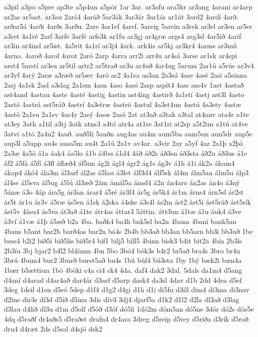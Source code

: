 {a3pil
a3po
a5pre
ap3te
a5p4un
a5pör
1ar
3ar.
ar3afu
ara5kr
ar3ang
4arani
ar4arp
ar2as
ar5ast.
ar3au
2ará4
4aráð
5ar3ák
3ar3ár
3ar1ás
ar1át
3ard2
4ardí
4arð.
arðar5á
4arði
4arðs
3arðu.
2are
3ar1ef
4aref.
5areig
5arein
a3rek
ar3el
ar3en
ar5er
a3ret
4a1ré
2arf
3arfe
3arfé
arfs3k
ar1fu
ar3gj
ar4græ
args4
arg3sl
4ar5ið
4arif
ar3in
ar4ind
ar5ist.
4a5rit
4a1rí
ar3j4
4ark.
ark4is
ar5kj
ar3kr4
4arms
ar3mú
4arna.
4aroð
4arol
4arot
2aró
2arp
4arra
arr2i
arr4u
ar4sá
3arse
ar1sk
ar4spi
arst4
5arstí
ar3su
ar5til
artr2
ar5trað
ar3u
ar4uð
4ar4ug
5arum
2ar1ú
a5rús
ar3v4
ar3yf
4arý
2aræ
a3ræð
ar5æv
4arö
as2
4a1sa
as3an
2a3sá
4ase
4asé
2asi
a5sinna
2asj
4a1sk
2asl
a3slag
2a1sm
4asn
4aso
4asó
2asp
aspít4
4ass
ass4v
1ast
4astað
ast4and
4astau
4aste
4asté
4astig
4astin
ast4ing
4astirð
4a1stí
4astj
ast3l
4asto
2astó
4astrá
ast5ráð
4astrí
4a3stræ
4aströ
4astul
4a3st4un
4astú
4a3sty
4astæ
4astö
2a1su
2a1sv
4as4y
2asý
4asæ
2asö
2at
at3að
a3tak
a3tal
at4anv
ata4r
a1te
at3ey
3ath
a1til
a3tj
3atk
atns3
a4tó
atr4a
at1re
3at1ri
at2sp
a5t2un
a1tú
at4ve
3atvi
a1tö
2a4u2
4auð.
auð5li
5auðn
aug4as
au4m
aum5ba
aum5un
aun5dr
aup5e
aup3l
a5upp
au4s
ausa5m
au4t
2a1ú
2a1v
av4ar.
a3vir
2ay
a5yf
4az
2a1þ
a2þó
2a3æ
4a5ö
á1a
áak4
áa5lo
á1b
á4bu
á1d4
4áð
áð2s
áð3sn
áð3sta
áð2u
áð3us
á1e
áf2
á5fá
á5fí
á3fl
áflæð4
áf5un
ág2i
ágl4
ágr2
ág1s
ág3v
á1h
á1i
ák2a
ákam4
ákap4
ákó4
ála3m
ál3arf
ál2as
á5lau
á3let
álf3d4
álf5sk
ál4m
álm5an
álm5u
álp3
ál4se
ál5sva
ál5ug
á5lú
ál3æð
2ám
ámál5a
ámsl4
á2n
án4aro
án2as
án4o
á3ný
5ánæ
á3o
4áp
ára5g
ár3an
árar4
á5ré
ár3f4
ár5g
ár5k4
ár1m
árns4
árn5sl
ár2st
ár5t
ár1u
ár3v
á5ræ
ás5en
á1sk
á2ska
á4ske
á3s4l
ás2m
ást2
ást5i
ást5ráð
ást5rík
ást5v
4ásu4
ás5va
át3að
á1te
átr4as
áttar3
5áttin.
átt3un
á1tæ
á1u
áuk4
á3ve
á3ví
á1væ
á1þ
á5æð
b2a
4ba.
baðk4
ba4h
bak5sl
ba2n
4bana
4baní
bank5an
4bans
b5ant
bar2b
barð4as
bar2n
bá4s
2b4b
bb3að
bb3an
bb5arn
bb3i
bb3uð
1be
bess4
b2i2
bið5i
bið5lis
bið5r4
bif1
bilj5
bill5
4binn
bisk3
b4it
bit2a
4bía
2b3ís
2b3íu
3bj
bjar2
b4l2
bl4íunn
4bn
5bo
3bó4
bók3s
b4r2
br5að
bra4s
3bro
br4u
3brú
4bum4
bur2
3burð
burst5að
bu4s
1bú
búf4
bú3sta
1by
1bý
bæk2i
bæn4a
1bær
b5ættism
1bö
4böki
c4a
ci4
ck4
4da.
daf4
dak2
3dal.
5dals
da1m4
d5ang
d4aní
d4arad
d4ar4að
dar4ár
d3arf
d5arp
dask4
da3sl
4dav
d1b
2dd
4dea
d5ef
3deg
1deil
d1en
d5eó
5dep
d1f4
d1g2
d4gi
d1h
d1i
di5fu
d3ill
dim4
di3ma
di3nav
d2ine
dir3s
dí3d
d5íð
d5ínu
3dís
dív3
3dj4
djarf5a
d1k2
d1l2
d2la
dl3að
d3lag
d3lau
d4lið
dl3u
d1m
d5olf
d5óð
d3óf
dó5lí
1dó2m
dóm5an
dó5ne
3dór
dó2s
dós5e
4dq
d5raðf
dr4aðs5
d5raðst
drafn4
dr4ara
3dreg
d5reip
d5rey
d5riða
d3rík
d5roð
dru4
d4ræt
2ds
d5sal
d4sjö
dsk2
}
